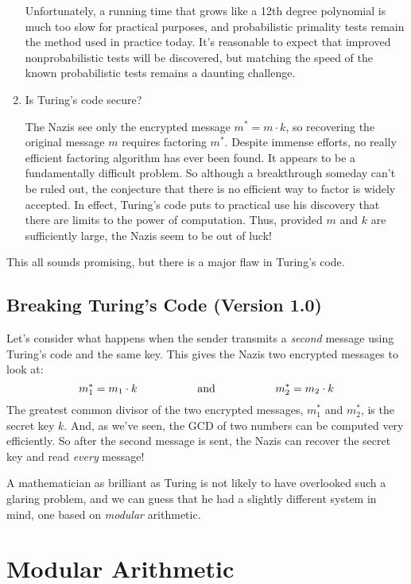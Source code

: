 \begin{enumerate}
{Unfortunately, a running time that grows like a 12th degree polynomial
is much too slow for practical purposes, and probabilistic primality
tests remain the method used in practice today.  It's reasonable to
expect that improved nonprobabilistic tests will be discovered, but
matching the speed of the known probabilistic tests remains a daunting
challenge.  }

\item Is Turing's code secure?

The Nazis see only the encrypted message $m^* = m \cdot k$, so
recovering the original message $m$ requires factoring $m^*$.  Despite
immense efforts, no really efficient factoring algorithm has ever been
found.  It appears to be a fundamentally difficult problem.  So
although a breakthrough someday can't be ruled out, the conjecture
that there is no efficient way to factor is widely accepted.  In
effect, Turing's code puts to practical use his discovery that there
are limits to the power of computation.  Thus, provided $m$ and $k$
are sufficiently large, the Nazis seem to be out of luck!

\end{enumerate}

This all sounds promising, but there is a major flaw in Turing's code.

\subsection{Breaking Turing's Code (Version 1.0)}

Let's consider what happens when the sender transmits a \emph{second}
message using Turing's code and the same key.  This gives the Nazis
two encrypted messages to look at:
\[
m_1^* = m_1 \cdot k
\hspace{0.75in} \text{and} \hspace{0.75in} m_2^* = m_2 \cdot k
\]
The greatest common divisor of the two encrypted messages, $m_1^*$ and
$m_2^*$, is the secret key $k$.  And, as we've seen, the GCD of two
numbers can be computed very efficiently.  So after the second message
is sent, the Nazis can recover the secret key and read \emph{every}
message!

A mathematician as brilliant as Turing is not likely to have
overlooked such a glaring problem, and we can guess that he had a
slightly different system in mind, one based on \emph{modular}
arithmetic.

\section{Modular Arithmetic}\label{modular_arithmeric_sec}

